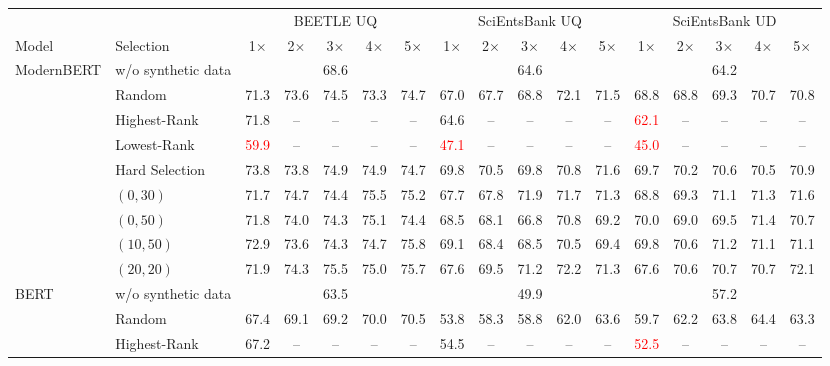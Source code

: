 \begin{table}[t]
\centering
\footnotesize
\setlength{\tabcolsep}{2pt}
\begin{tabular}{llccccccccccccccc}
\toprule
 & & \multicolumn{5}{c}{BEETLE UQ} & \multicolumn{5}{c}{SciEntsBank UQ} & \multicolumn{5}{c}{SciEntsBank UD} \\
\cmidrule(lr){3-7}\cmidrule(lr){8-12}\cmidrule(lr){13-17}
Model & Selection & 1$\times$ & 2$\times$ & 3$\times$ & 4$\times$ & 5$\times$ & 1$\times$ & 2$\times$ & 3$\times$ & 4$\times$ & 5$\times$ & 1$\times$ & 2$\times$ & 3$\times$ & 4$\times$ & 5$\times$ \\
\midrule
\multirow{9}{*}{ModernBERT} & w/o synthetic data & \multicolumn{5}{c}{68.6} & \multicolumn{5}{c}{64.6} & \multicolumn{5}{c}{64.2} \\
 & Random & 71.3 & 73.6 & 74.5 & 73.3 & 74.7 & 67.0 & 67.7 & 68.8 & 72.1 & 71.5 & 68.8 & 68.8 & 69.3 & 70.7 & 70.8 \\
 & Highest-Rank & 71.8 & -- & -- & -- & -- & 64.6 & -- & -- & -- & -- & \textcolor{red}{62.1} & -- & -- & -- & -- \\
 & Lowest-Rank & \textcolor{red}{59.9} & -- & -- & -- & -- & \textcolor{red}{47.1} & -- & -- & -- & -- & \textcolor{red}{45.0} & -- & -- & -- & -- \\
 & Hard Selection & 73.8 & 73.8 & 74.9 & 74.9 & 74.7 & 69.8 & 70.5 & 69.8 & 70.8 & 71.6 & 69.7 & 70.2 & 70.6 & 70.5 & 70.9 \\
 & $(0, 30)$ & 71.7 & 74.7 & 74.4 & 75.5 & 75.2 & 67.7 & 67.8 & 71.9 & 71.7 & 71.3 & 68.8 & 69.3 & 71.1 & 71.3 & 71.6 \\
 & $(0, 50)$ & 71.8 & 74.0 & 74.3 & 75.1 & 74.4 & 68.5 & 68.1 & 66.8 & 70.8 & 69.2 & 70.0 & 69.0 & 69.5 & 71.4 & 70.7 \\
 & $(10, 50)$ & 72.9 & 73.6 & 74.3 & 74.7 & 75.8 & 69.1 & 68.4 & 68.5 & 70.5 & 69.4 & 69.8 & 70.6 & 71.2 & 71.1 & 71.1 \\
 & $(20, 20)$ & 71.9 & 74.3 & 75.5 & 75.0 & 75.7 & 67.6 & 69.5 & 71.2 & 72.2 & 71.3 & 67.6 & 70.6 & 70.7 & 70.7 & 72.1 \\
\midrule
\multirow{9}{*}{BERT} & w/o synthetic data & \multicolumn{5}{c}{63.5} & \multicolumn{5}{c}{49.9} & \multicolumn{5}{c}{57.2} \\
 & Random & 67.4 & 69.1 & 69.2 & 70.0 & 70.5 & 53.8 & 58.3 & 58.8 & 62.0 & 63.6 & 59.7 & 62.2 & 63.8 & 64.4 & 63.3 \\
 & Highest-Rank & 67.2 & -- & -- & -- & -- & 54.5 & -- & -- & -- & -- & \textcolor{red}{52.5} & -- & -- & -- & -- \\

\end{tabular}
\end{table}
